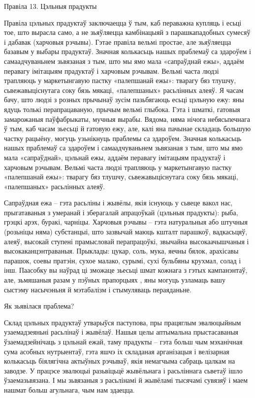 Правіла 13. Цэльныя прадукты

Правіла цэльных прадуктаў заключаецца ў тым, каб пераважна купляць і есьці тое, што вырасла само, а не зьяўляецца камбінацыяй з парашкападобных сумесяў і дабавак (харчовыя рэчывы). Гэтае правіла вельмі простае, але зьяўляецца базавым у выбары прадуктаў. Значная колькасьць нашых праблемаў са здароўем і самаадчуваньнем зьвязаная з тым, што мы ямо мала «сапраўднай ежы», аддаём перавагу імітацыям прадуктаў і харчовым рэчывам. Вельмі часта людзі трапляюць у маркетынгавую пастку «палепшанай ежы»: тварагу бяз тлушчу, сьвежавыціснутага соку бязь мякаці, «палепшаных» расьлінных алеяў. Я часам бачу, што людзі з розных прычынаў зусім пазьбягаюць есьці цэльную ежу: яны ядуць толькі перапрацаваную, прычым вельмі глыбока. Гэта і шматкі, гатовыя замарожаныя паўфабрыкаты, мучныя вырабы. Вядома, няма нічога небясьпечнага ў тым, каб часам зьесьці й гатовую ежу, але, калі яна пачынае складаць большую частку рацыёну, могуць узьнікнуць праблемы са здароўем.
Значная колькасьць нашых праблемаў са здароўем і самаадчуваньнем зьвязаная з тым, што мы ямо мала «сапраўднай», цэльнай ежы, аддаём перавагу імітацыям прадуктаў і харчовым рэчывам. Вельмі часта людзі трапляюць у маркетынгавую пастку «палепшанай ежы»: тварагу бяз тлушчу, сьвежавыціснутага соку бязь мякаці, «палепшаных» расьлінных алеяў.

Сапраўдная ежа – гэта расьліны і жывёлы, якія існуюць у сьвеце вакол нас, прыгатаваныя з умеранай і зберагалай апрацоўкай (цэльныя прадукты): рыба, грэцкі арэх, буракі, чарніцы.
Харчовыя рэчывы – гэта натуральныя або штучныя (розьніцы няма) субстанцыі, што зазвычай маюць кшталт парашкоў, вадкасьцяў, алеяў, высокай ступені прамысловай перапрацоўкі, звычайна высокаачышчаныя і высокаканцэнтраваныя. Прыклады: цукар, соль, мука, яечны бялок, арахісавы парашок, соевы пратэін, сухое малако, сурымі, сухі бульбяны крухмал, солад і інш. Паасобку вы наўрад ці зможаце зьесьці шмат кожнага з гэтых кампанэнтаў, але, зьмяшаныя разам у пэўных прапорцыях , яны могуць узламаць вашу сыстэму насычэньня й мэтабалізм і стымуляваць пераяданьне.

Як зьявілася праблема?

Склад цэльных прадуктаў утварыўся паступова, пры працяглым эвалюцыйным узаемадзеяньні расьлінаў і жывёлаў. Нашыя целы аптымальна прыстасаваныя ўзаемадзейнічаць з цэльнай ежай, таму прадукты – гэта больш чым мэханічная сума асобных нутрыентаў, гэта яшчэ іх складаная арганізацыя і велізарная колькасьць біялягічна актыўных рэчываў, якія немагчыма сабраць цалкам на заводзе. У працэсе эвалюцыі разьвіцьцё жывёльнага і расьліннага сьветаў ішло ўзаемазьвязана. І мы зьвязаныя з расьлінамі й жывёламі тысячамі сувязяў і маем нашмат больш агульнага, чым нам здаецца.


